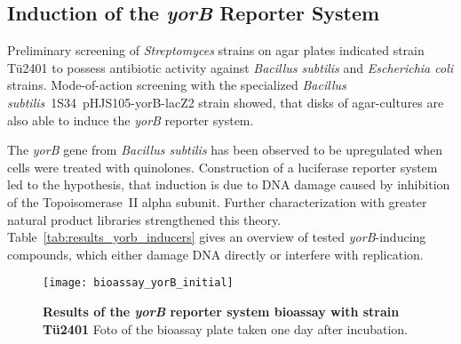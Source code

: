 


\subsection{Induction of the \textit{yorB} Reporter System} %
\label{sub:induction_of_the_yorb_reporter_system}

Preliminary screening of \emph{Streptomyces} strains on agar plates indicated strain Tü2401 to possess antibiotic activity against \emph{Bacillus subtilis} and \emph{Escherichia coli} strains.
Mode-of-action screening with the specialized \textit{Bacillus subtilis}~1S34~pHJS105-yorB-lacZ2 strain showed, that disks of agar-cultures are also able to induce the \emph{yorB} reporter system.

The \textit{yorB} gene from \textit{Bacillus subtilis} has been observed to be upregulated when cells were treated with quinolones.\autocite{Hutter2004a}
Construction of a luciferase reporter system led to the hypothesis, that induction is due to DNA damage caused by inhibition of the Topoisomerase~II alpha subunit.\autocite{Hutter2004}
Further characterization with greater natural product libraries strengthened this theory.\autocite{Mariner2011,Urban2007}
Table~\ref{tab:results_yorb_inducers} gives an overview of tested \textit{yorB}-inducing compounds, which either damage DNA directly or interfere with replication.

\begin{figure}[htbp]
	\centering
	\texttt{[image: bioassay\_yorB\_initial]}
	\caption[Results of the \textit{yorB} reporter system bioassay with strain Tü2401]{%
		\textbf{Results of the \textit{yorB} reporter system bioassay with strain Tü2401}
		Foto of the bioassay plate taken one day after incubation.
	}
	\label{fig:results_yorB_initial}
\end{figure}

